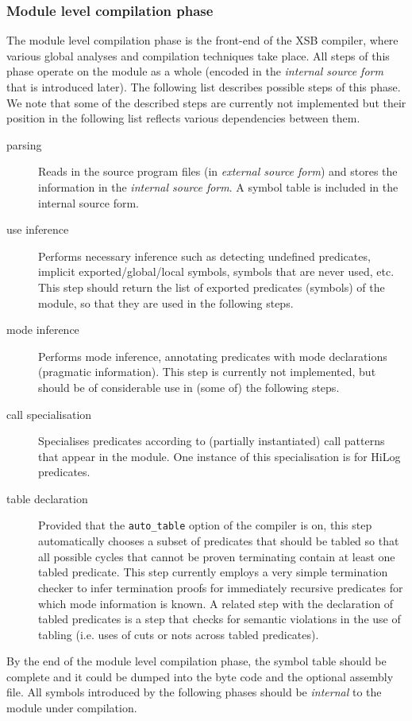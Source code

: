 \subsubsection{Module level compilation phase}
The module level compilation phase is the front-end of the XSB
compiler, where various global analyses and compilation techniques
take place.  All steps of this phase operate on the module as a whole
(encoded in the {\it internal source form} that is introduced later).
The following list describes possible steps of this phase.  We note
that some of the described steps are currently not implemented but their
position in the following list reflects various dependencies between them.
\begin{description}
\item[parsing]
	Reads in the source program files (in {\it external source form})
	and stores the information in the {\it internal source form}.
	A symbol table is included in the internal source form.
\item[use inference]
	Performs necessary inference such as detecting undefined predicates,
	implicit exported/global/local symbols, symbols that are never
	used, etc.  This step should return the list of exported
	predicates (symbols) of the module, so that they are used in
	the following steps.
\item[mode inference]
	Performs mode inference, annotating predicates with mode declarations
	(pragmatic information).  This step is currently not implemented,
	but should be of considerable use in (some of) the following steps.
\item[call specialisation]
	Specialises predicates according to (partially instantiated)
	call patterns that appear in the module.  One instance of this
	specialisation is for HiLog predicates.
\item[table declaration]
	Provided that the {\tt auto\_table} option of the compiler is
	on, this step automatically chooses a subset of predicates that
	should be tabled so that all possible cycles that cannot be proven
	terminating contain at least one tabled predicate.  This step
	currently employs a very simple termination checker to infer
	termination proofs for immediately recursive predicates for which
	mode information is known.
	A related step with the declaration of tabled predicates is a step
	that checks for semantic violations in the use of tabling
	(i.e. uses of cuts or nots across tabled predicates).
\end{description}
By the end of the module level compilation phase, the symbol table
should be complete and it could be dumped into the byte code and the
optional assembly file.  All symbols introduced by the following
phases should be {\em internal\/} to the module under compilation.

